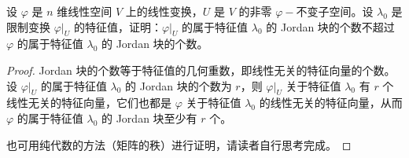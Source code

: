 \documentclass[../../main.tex]{subfiles}
\begin{document}
\begin{proposition}\label{proposition:限制变换的任一Jordan块的个数一定小于原线性变换的特征值对应的Jordan块的个数}
设 \(\varphi\) 是 \(n\) 维线性空间 \(V\) 上的线性变换，\(U\) 是 \(V\) 的非零 \(\varphi -\)不变子空间。设 \(\lambda_0\) 是限制变换 \(\varphi|_U\) 的特征值，证明：\(\varphi|_U\) 的属于特征值 \(\lambda_0\) 的 Jordan 块的个数不超过 \(\varphi\) 的属于特征值 \(\lambda_0\) 的 Jordan 块的个数。
\end{proposition}
\begin{proof}
Jordan 块的个数等于特征值的几何重数，即线性无关的特征向量的个数。设 \(\varphi|_U\) 的属于特征值 \(\lambda_0\) 的 Jordan 块的个数为 \(r\)，则 \(\varphi|_U\) 关于特征值 \(\lambda_0\) 有 \(r\) 个线性无关的特征向量，它们也都是 \(\varphi\) 关于特征值 \(\lambda_0\) 的线性无关的特征向量，从而 \(\varphi\) 的属于特征值 \(\lambda_0\) 的 Jordan 块至少有 \(r\) 个。

也可用纯代数的方法（矩阵的秩）进行证明，请读者自行思考完成。

\end{proof}
\end{document}
